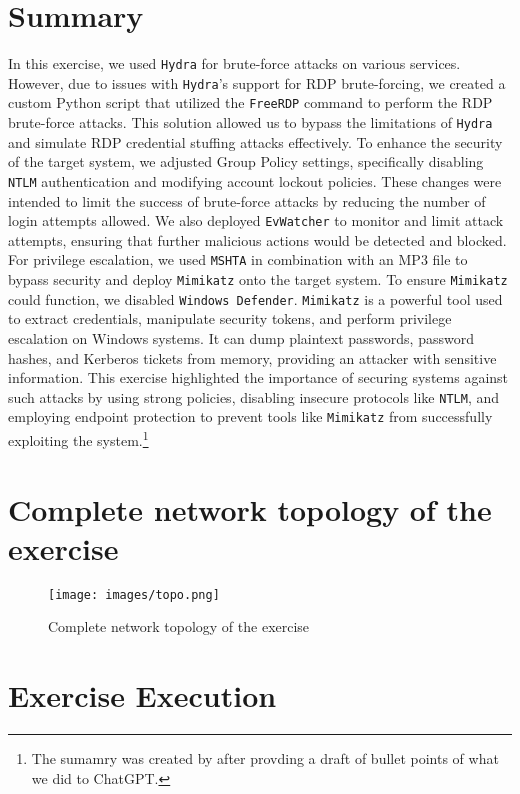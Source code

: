 \documentclass[a4paper]{article}
\newcommand{\abc}{\hfill \break}
\begin{document}
\section{Summary}
In this exercise, we used \texttt{Hydra} for brute-force attacks on various services. However, due to issues with \texttt{Hydra}'s support for RDP brute-forcing, we created a custom Python script that utilized the \texttt{FreeRDP} command to perform the RDP brute-force attacks. This solution allowed us to bypass the limitations of \texttt{Hydra} and simulate RDP credential stuffing attacks effectively.\abc
To enhance the security of the target system, we adjusted Group Policy settings, specifically disabling \texttt{NTLM} authentication and modifying account lockout policies. These changes were intended to limit the success of brute-force attacks by reducing the number of login attempts allowed.\abc
We also deployed \texttt{EvWatcher} to monitor and limit attack attempts, ensuring that further malicious actions would be detected and blocked. For privilege escalation, we used \texttt{MSHTA} in combination with an MP3 file to bypass security and deploy \texttt{Mimikatz} onto the target system. To ensure \texttt{Mimikatz} could function, we disabled \texttt{Windows Defender}.\abc
\texttt{Mimikatz} is a powerful tool used to extract credentials, manipulate security tokens, and perform privilege escalation on Windows systems. It can dump plaintext passwords, password hashes, and Kerberos tickets from memory, providing an attacker with sensitive information. This exercise highlighted the importance of securing systems against such attacks by using strong policies, disabling insecure protocols like \texttt{NTLM}, and employing endpoint protection to prevent tools like \texttt{Mimikatz} from successfully exploiting the system.\footnote{The sumamry was created by after provding a draft of bullet points of what we did to ChatGPT.}
\newpage

\section{Complete network topology of the exercise}
\begin{figure}[h]
	\texttt{[image: images/topo.png]}
	\centering
	\caption{Complete network topology of the exercise}
\end{figure}\abc
\newpage

\section{Exercise Execution}
\end{document}
